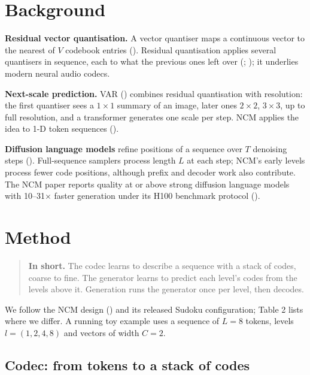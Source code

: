 \documentclass[
  british,
]{article}
\begin{document}
\section{Background}\label{background}

\textbf{Residual vector quantisation.} A vector quantiser maps a
continuous vector to the nearest of \(V\) codebook entries
(). Residual quantisation
applies several quantisers in sequence, each to what the previous ones
left over (;
); it underlies
modern neural audio codecs.

\textbf{Next-scale prediction.} VAR () combines residual quantisation with resolution: the first
quantiser sees a \(1\times1\) summary of an image, later ones
\(2\times2\), \(3\times3\), up to full resolution, and a transformer
generates one scale per step. NCM applies the idea to 1-D token
sequences ().

\textbf{Diffusion language models} refine positions of a sequence over
\(T\) denoising steps ().
Full-sequence samplers process length \(L\) at each step; NCM's early
levels process fewer code positions, although prefix and decoder work
also contribute. The NCM paper reports quality at or above strong
diffusion language models with 10--31× faster generation under its H100
benchmark protocol ().

\section{Method}\label{method}

\begin{quote}
\textbf{In short.} The codec learns to describe a sequence with a stack
of codes, coarse to fine. The generator learns to predict each level's
codes from the levels above it. Generation runs the generator once per
level, then decodes.
\end{quote}

We follow the NCM design ()
and its released Sudoku configuration; Table 2 lists where we differ. A
running toy example uses a sequence of \(L = 8\) tokens, levels
\(l = (1, 2, 4, 8)\) and vectors of width \(C = 2\).

\subsection{Codec: from tokens to a stack of
codes}\label{codec-from-tokens-to-a-stack-of-codes}
\end{document}
